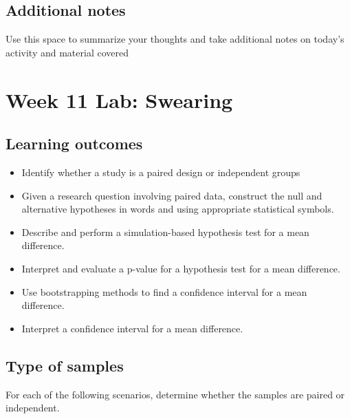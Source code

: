 \documentclass[
]{report}
\begin{document}
\hypertarget{additional-notes-17}{%
\subsection{Additional notes}\label{additional-notes-17}}

Use this space to summarize your thoughts and take additional notes on today's activity and material covered

\newpage

\hypertarget{week-11-lab-swearing}{%
\section{Week 11 Lab: Swearing}\label{week-11-lab-swearing}}


\hypertarget{learning-outcomes-22}{%
\subsection{Learning outcomes}\label{learning-outcomes-22}}

\begin{itemize}
\item
  Identify whether a study is a paired design or independent groups
\item
  Given a research question involving paired data, construct the null and alternative hypotheses
  in words and using appropriate statistical symbols.
\item
  Describe and perform a simulation-based hypothesis test for a mean difference.
\item
  Interpret and evaluate a p-value for a hypothesis test for a mean difference.
\item
  Use bootstrapping methods to find a confidence interval for a mean difference.
\item
  Interpret a confidence interval for a mean difference.
\end{itemize}

\hypertarget{type-of-samples}{%
\subsection{Type of samples}\label{type-of-samples}}

For each of the following scenarios, determine whether the samples are paired or independent.
\end{document}
